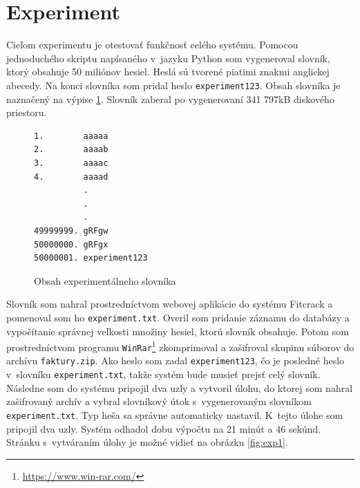 \documentclass[slovak]{fitthesis}
\begin{document}
\section{Experiment}
Cieľom experimentu je otestovať funkčnosť celého systému. Pomocou jednoduchého skriptu napísaného v~jazyku Python som vygeneroval slovník, ktorý obsahuje 50 miliónov hesiel. Heslá sú tvorené piatimi znakmi anglickej abecedy. Na konci slovníka som pridal heslo \texttt{experiment123}. Obsah slovníka je naznačený na výpise \ref{lst:experimentDict}. Slovník zaberal po vygenerovaní 341 797kB diskového priestoru.
\begin{figure}[H]
\begin{center}
\begin{varwidth}{\linewidth}
\begin{verbatim}
1.        aaaaa
2.        aaaab
3.        aaaac
4.        aaaad
          .
          .
          .
49999999. gRFgw
50000000. gRFgx
50000001. experiment123
\end{verbatim}
\end{varwidth}
\end{center}
\caption{Obsah experimentálneho slovníka}
\label{lst:experimentDict}
\end{figure}
Slovník som nahral prostredníctvom webovej aplikácie do systému Fitcrack a pomenoval som ho \texttt{experiment.txt}. Overil som pridanie záznamu do databázy a vypočítanie správnej veľkosti množiny hesiel, ktorú slovník obsahuje. Potom som prostredníctvom programu \texttt{WinRar}\footnote{\url{https://www.win-rar.com/}} zkomprimoval a zašifroval skupinu súborov do archívu \texttt{faktury.zip}. Ako heslo som zadal \texttt{experiment123}, čo je posledné heslo v~slovníku \texttt{experiment.txt}, takže systém bude musieť prejsť celý slovník. Následne som do systému pripojil dva uzly a vytvoril úlohu, do ktorej som nahral zašifrovaný archív a vybral slovníkový útok s~vygenerovaným slovníkom \texttt{experiment.txt}. Typ heša sa správne automaticky nastavil. K~tejto úlohe som pripojil dva uzly. Systém odhadol dobu výpočtu na 21 minút a 46 sekúnd. Stránku s~vytváraním úlohy je možné vidieť na obrázku \ref{fig:exp1}. 
\end{document}
